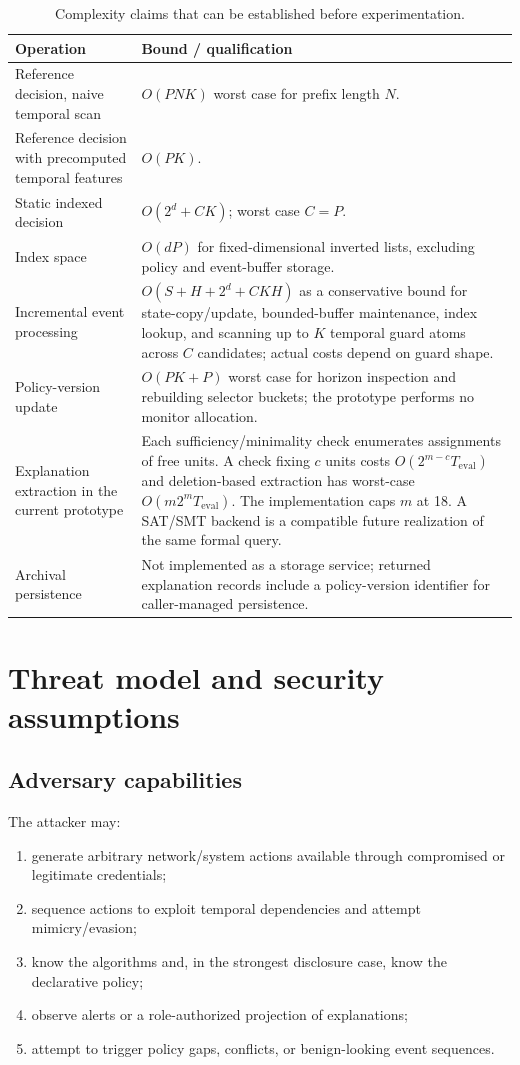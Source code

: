 \documentclass[11pt]{article}
\theoremstyle{remark}
\begin{document}
\begin{table}[h]
\centering
\begin{tabularx}{\textwidth}{p{4.2cm}X}
\toprule
Operation & Bound / qualification \\
\midrule
Reference decision, naive temporal scan & $O(PNK)$ worst case for prefix length $N$.\\
Reference decision with precomputed temporal features & $O(PK)$.\\
Static indexed decision & $O(2^d+CK)$; worst case $C=P$.\\
Index space & $O(dP)$ for fixed-dimensional inverted lists, excluding policy and event-buffer storage.\\
Incremental event processing & $O(S+H+2^d+CKH)$ as a conservative bound for state-copy/update, bounded-buffer maintenance, index lookup, and scanning up to $K$ temporal guard atoms across $C$ candidates; actual costs depend on guard shape.\\
Policy-version update & $O(PK+P)$ worst case for horizon inspection and rebuilding selector buckets; the prototype performs no monitor allocation.\\
Explanation extraction in the current prototype & Each sufficiency/minimality check enumerates assignments of free units. A check fixing $c$ units costs $O(2^{m-c}T_{\mathrm{eval}})$ and deletion-based extraction has worst-case $O(m2^mT_{\mathrm{eval}})$. The implementation caps $m$ at 18. A SAT/SMT backend is a compatible future realization of the same formal query.\\
Archival persistence & Not implemented as a storage service; returned explanation records include a policy-version identifier for caller-managed persistence.\\
\bottomrule
\end{tabularx}
\caption{Complexity claims that can be established before experimentation.}\label{tab:complexity}
\end{table}

\section{Threat model and security assumptions}

\subsection{Adversary capabilities}
The attacker may:
\begin{enumerate}[label=(A\arabic*)]
\item generate arbitrary network/system actions available through compromised or legitimate credentials;
\item sequence actions to exploit temporal dependencies and attempt mimicry/evasion;
\item know the algorithms and, in the strongest disclosure case, know the declarative policy;
\item observe alerts or a role-authorized projection of explanations;
\item attempt to trigger policy gaps, conflicts, or benign-looking event sequences.
\end{enumerate}
\end{document}
